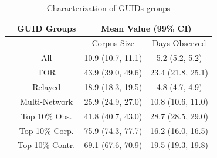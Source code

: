 \documentclass[notes]{beamer}
\begin{document}
\begin{frame}

\begin{block}

\begin{table} 

\centering

\caption{Characterization of GUIDs groups} 
\label{tab:table4}
\begin{tabular}{c|ccc}\hline & \multicolumn{1}{c}{GUID Groups} & \multicolumn{2}{c}{Mean Value (99\% CI)} \\

\hline 
& & Corpus Size & Days Observed \\ 

\hline
\hline
\parbox[t]{2mm}{} & All & 10.9 (10.7, 11.1) & 5.2 (5.2, 5.2) \\
& TOR & 43.9 (39.0, 49.6) & 23.4 (21.8, 25.1)\\
& Relayed & 18.9 (18.3, 19.5) & 4.8 (4.7, 4.9)\\
& Multi-Network & 25.9 (24.9, 27.0) & 10.8 (10.6, 11.0)\\
& Top 10\% Obs. & 41.8 (40.7, 43.0) & 28.7 (28.5, 29.0)\\
& Top 10\% Corp. & 75.9 (74.3, 77.7) & 16.2 (16.0, 16.5)\\
& Top 10\% Contr. & 69.1 (67.6, 70.9) & 19.5 (19.3, 19.8)\\
\hline

\end{tabular}

\end{table}

\end{block}

\end{frame}
\end{document}

